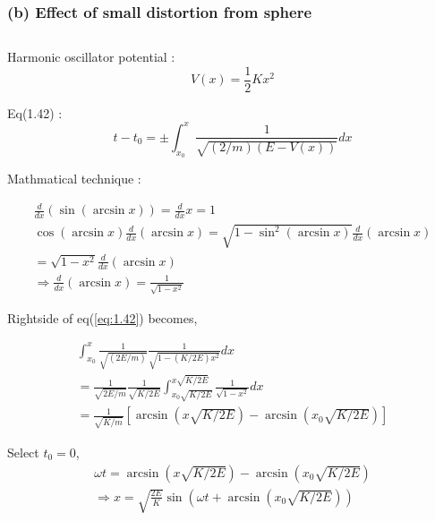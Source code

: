 \documentclass{jarticle}
\begin{document}
\subsubsection*{(b) Effect of small distortion from sphere} 

\subsection{}

\subsection{}
Harmonic oscillator potential :
\begin{equation}
	V(x) = \frac{1}{2}Kx^2
\end{equation}

Eq(1.42) : 
\begin{equation}\label{eq:1.42}
	t-t_0 = \pm \int_{x_0}^x \frac{1}{\sqrt{(2/m)(E-V(x))}}dx
\end{equation}

Mathmatical technique : 

\begin{eqnarray}
	\frac{d}{dx}(\sin{(\arcsin{x})}) = \frac{d}{dx}x = 1 \nonumber \\
	\cos{(\arcsin{x})}\frac{d}{dx}(\arcsin{x}) = \sqrt{1-\sin^2{(\arcsin{x})}}\frac{d}{dx}(\arcsin{x}) \nonumber \\
	= \sqrt{1 - x^2}\frac{d}{dx}(\arcsin{x}) \nonumber \\
	\Rightarrow \frac{d}{dx}(\arcsin{x}) = \frac{1}{\sqrt{1-x^2}}
\end{eqnarray}

Rightside of eq(\ref{eq:1.42}) becomes,

\begin{eqnarray}
	\int_{x_0}^x \frac{1}{\sqrt{(2E/m)}}\frac{1}{\sqrt{1 - (K/2E)x^2}}dx \nonumber \\
	= \frac{1}{\sqrt{2E/m}} \frac{1}{\sqrt{K/2E}} \int_{x_0\sqrt{K/2E}}^{x\sqrt{K/2E}}\frac{1}{\sqrt{1-x^2}}dx \nonumber \\
	= \frac{1}{\sqrt{K/m}} \left[\arcsin{(x\sqrt{K/2E})} - \arcsin{(x_0\sqrt{K/2E})}\right] \nonumber
\end{eqnarray}

Select $t_0 = 0$, 
\begin{eqnarray}
	\omega t = \arcsin{(x\sqrt{K/2E})} - \arcsin{(x_0\sqrt{K/2E})} \nonumber \\
	\Rightarrow x = \sqrt{\frac{2E}{K}} \sin{\left(\omega t + \arcsin{(x_0\sqrt{K/2E})}\right)}
\end{eqnarray}
\end{document}
